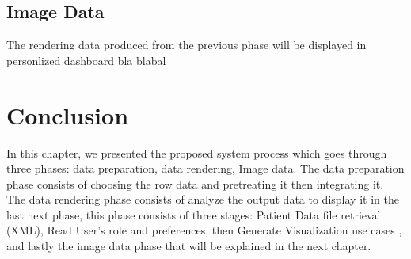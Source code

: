 \subsection{Image Data}
The rendering data produced from the previous phase will be displayed in  personlized dashboard bla blabal  
\section{Conclusion}
In this chapter, we presented the proposed system process which goes through three phases: data preparation, data rendering, Image data. The data preparation phase consists of choosing the row data and pretreating it then integrating it. The data rendering phase consists of analyze the output data to display it in the last next phase,  this phase consists of three stages:  Patient Data file retrieval (XML), Read User’s role and preferences, then Generate Visualization use cases , and lastly the image data phase that will be explained in the next chapter. 
